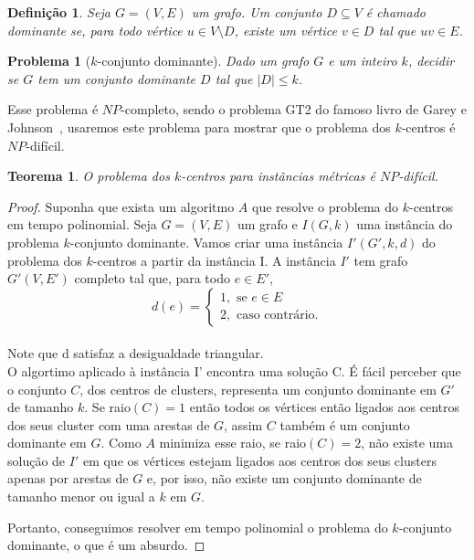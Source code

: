 \documentclass[12pt]{article}
\newtheorem{theorem}{Teorema}[section]
\newtheorem{definition}{Definição}[section]
\newtheorem{problem}{Problema}[section] %
\newcommand{\NP}{\mathit{NP}}
\begin{document}
\begin{definition}
    Seja $G = (V,E)$ um grafo. Um conjunto $D \subseteq V$ é chamado \emph{dominante} se, para todo vértice $u \in V \setminus D$, existe um vértice $v \in D$ tal que $uv \in E$.
\end{definition}

\begin{problem}[$k$-conjunto dominante]
    Dado um grafo $G$ e um inteiro $k$, decidir se $G$ tem um conjunto dominante $D$ tal que $|D| \leq k$.      
\end{problem}
Esse problema é $\NP$-completo, sendo o problema GT2 do famoso livro de Garey e Johnson~\cite{garey1979computers}, usaremos este problema para mostrar que o problema dos $k$-centros é $\NP$-difícil.

\begin{theorem}\label{theorem:2.1}
    O problema dos $k$-centros para instâncias métricas é $\NP$-difícil.
\end{theorem}

\begin{proof}
    Suponha que exista um algoritmo $A$ que resolve o problema do $k$-centros em tempo polinomial. Seja $G = (V,E)$ um grafo e $I(G,k)$ uma instância do problema $k$-conjunto dominante. Vamos criar uma instância $I'(G',k,d)$ do problema dos $k$-centros a partir da instância I. A instância $I'$ tem grafo $G'(V,E')$ completo tal que, para todo $e \in E'$, \\
    \[
    d(e) = \begin{cases}
            1, \text{ se } e \in E \\
            2, \text{ caso contrário.} 
            \end{cases}\]\\
    Note que d satisfaz a desigualdade triangular.\\
    O algortimo aplicado à instância I' encontra uma solução C. É fácil perceber que o conjunto $C$, dos centros de clusters, representa um conjunto dominante em $G'$ de tamanho $k$. Se raio$(C)=1$ então todos os vértices então ligados aos centros dos seus cluster com uma arestas de $G$, assim $C$ também é um conjunto dominante em $G$. Como $A$ minimiza esse raio, se raio$(C)=2$, não existe uma solução de $I'$ em que os vértices estejam ligados aos centros dos seus clusters apenas por arestas de $G$ e, por isso, não existe um conjunto dominante de tamanho menor ou igual a $k$ em $G$.

    Portanto, conseguimos resolver em tempo polinomial o problema do $k$-conjunto dominante, o que é um absurdo.
\end{proof}
\end{document}
